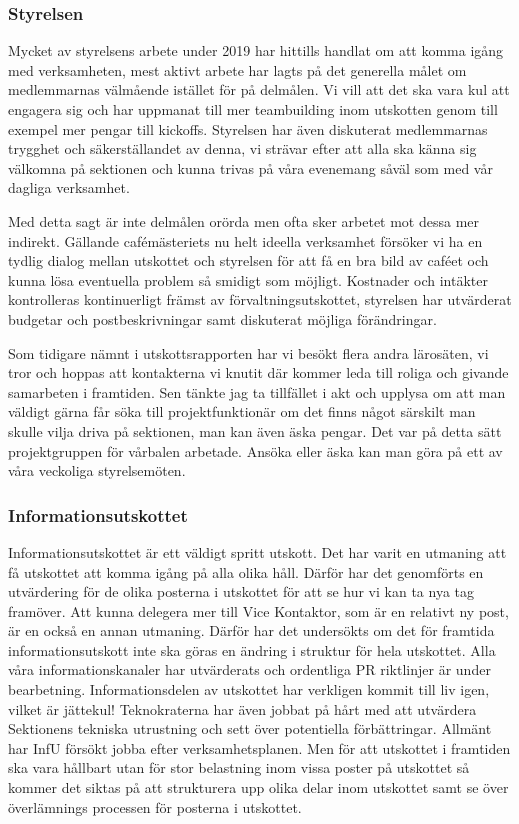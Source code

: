 \documentclass[../_main/handlingar.tex]{subfiles}
\begin{document}

\subsubsection*{Styrelsen}

Mycket av styrelsens arbete under 2019 har hittills handlat om att komma igång med verksamheten, mest aktivt arbete har lagts på det generella målet om medlemmarnas välmående istället för på delmålen. Vi vill att det ska vara kul att engagera sig och har uppmanat till mer teambuilding inom utskotten genom till exempel mer pengar till kickoffs. Styrelsen har även diskuterat medlemmarnas trygghet och säkerställandet av denna, vi strävar efter att alla ska känna sig välkomna på sektionen och kunna trivas på våra evenemang såväl som med vår dagliga verksamhet. 

Med detta sagt är inte delmålen orörda men ofta sker arbetet mot dessa mer indirekt. Gällande cafémästeriets nu helt ideella verksamhet försöker vi ha en tydlig dialog mellan utskottet och styrelsen för att få en bra bild av caféet och kunna lösa eventuella problem så smidigt som möjligt. Kostnader och intäkter kontrolleras kontinuerligt främst av förvaltningsutskottet, styrelsen har utvärderat budgetar och postbeskrivningar samt diskuterat möjliga förändringar. 

Som tidigare nämnt i utskottsrapporten har vi besökt flera andra lärosäten, vi tror och hoppas att kontakterna vi knutit där kommer leda till roliga och givande samarbeten i framtiden. Sen tänkte jag ta tillfället i akt och upplysa om att man väldigt gärna får söka till projektfunktionär om det finns något särskilt man skulle vilja driva på sektionen, man kan även äska pengar. Det var på detta sätt projektgruppen för vårbalen arbetade. Ansöka eller äska kan man göra på ett av våra veckoliga styrelsemöten. 


\subsubsection*{Informationsutskottet}

Informationsutskottet är ett väldigt spritt utskott. Det har varit en utmaning att få utskottet att komma igång på alla olika håll. Därför har det genomförts en utvärdering för de olika posterna i utskottet för att se hur vi kan ta nya tag framöver. 
Att kunna delegera mer till Vice Kontaktor, som är en relativt ny post, är en också en annan utmaning. Därför har det undersökts om det för framtida informationsutskott inte ska göras en ändring i struktur för hela utskottet. 
Alla våra informationskanaler har utvärderats och ordentliga PR riktlinjer är under bearbetning. Informationsdelen av utskottet har verkligen kommit till liv igen, vilket är jättekul! Teknokraterna har även jobbat på hårt med att utvärdera Sektionens tekniska utrustning och sett över potentiella förbättringar. 
Allmänt har InfU försökt jobba efter verksamhetsplanen. Men för att utskottet i framtiden ska vara hållbart utan för stor belastning inom vissa poster på utskottet så kommer det siktas på att strukturera upp olika delar inom utskottet samt se över överlämnings processen för posterna i utskottet.
\end{document}
